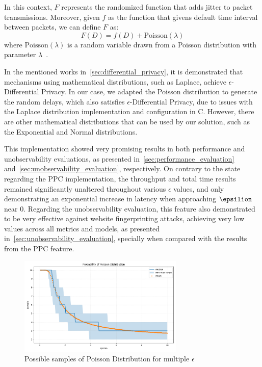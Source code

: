 In this context, $F$ represents the randomized function that adds jitter to packet transmissions. Moreover, given $f$ as the function that givens default time interval between packets, we can define $F$ as:
\[F(D) = f(D) + \text{Poisson}(\lambda)\]
where $\text{Poisson}(\lambda)$ is a random variable drawn from a Poisson distribution with parameter $\lambda$~\cite{DP_Book, AlgFoundationsDP}. 


In the mentioned works in~\autoref{sec:differential_privacy}, it is demonstrated that mechanisms using mathematical distributions, such as Laplace, achieve $\epsilon$-Differential Privacy. In our case, we adapted the Poisson distribution to generate the random delays, which also satisfies $\epsilon$-Differential Privacy, due to issues with the Laplace distribution implementation and configuration in C. However, there are other mathematical distributions that can be used by our solution, such as the Exponential and Normal distributions.

This implementation showed very promising results in both performance and unobservability evaluations, as presented in~\autoref{sec:performance_evaluation} and~\autoref{sec:unobservability_evaluation}, respectively. On contrary to the state regarding the PPC implementation, the throughput and total time results remained significantly unaltered throughout various $\epsilon$ values, and only demonstrating an exponential increase in latency when approaching $\epsilion$ near 0. Regarding the unobservability evaluation, this feature also demonstrated to be very effective against website fingerprinting attacks, achieving very low values across all metrics and models, as presented in~\autoref{sec:unobservability_evaluation}, specially when compared with the results from the PPC feature.

\begin{figure}
    \centering
    \includegraphics[width=0.7\textwidth]{Chapters/Figures/Plots/epsilon_stats.png}
    \caption{Possible samples of Poisson Distribution for multiple $\epsilon$}\label{fig:poisson_distribution}
\end{figure}

